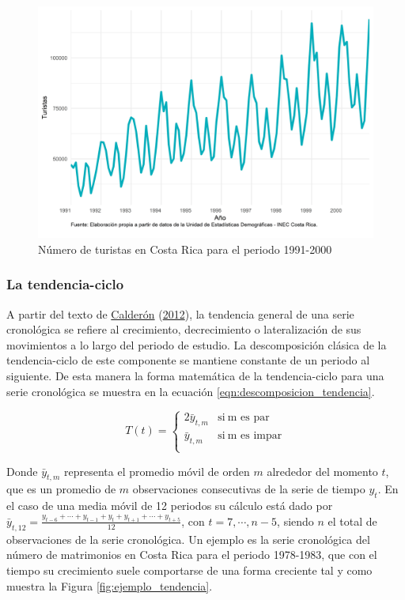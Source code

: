 \documentclass[
]{article}
\begin{document}
\begin{figure}[H]
\includegraphics[width=1\linewidth,height=1\textheight]{Tesis_files/figure-latex/ejemplo_multiplicativa-1} \caption{Número de turistas en Costa Rica para el periodo 1991-2000}\label{fig:ejemplo_multiplicativa}
\end{figure}

\subsubsection{La tendencia-ciclo}

A partir del texto de
\protect\hyperlink{ref-calderon2012estadistica}{Calderón}
(\protect\hyperlink{ref-calderon2012estadistica}{2012}), la tendencia
general de una serie cronológica se refiere al crecimiento,
decrecimiento o lateralización de sus movimientos a lo largo del periodo
de estudio. La descomposición clásica de la tendencia-ciclo de este
componente se mantiene constante de un periodo al siguiente. De esta
manera la forma matemática de la tendencia-ciclo para una serie
cronológica se muestra en la ecuación
\eqref{eqn:descomposicion_tendencia}.

\begin{equation}
\label{eqn:descomposicion_tendencia}
T(t)=
\begin{cases}
2\bar y_{t,m} & \text{si}\ \text{m es par} \\
\bar y_{t, m} & \text{si}\ \text{m es impar} \\
\end{cases}
\end{equation}

Donde \(\bar y_{t,m}\) representa el promedio móvil de orden \(m\)
alrededor del momento \(t\), que es un promedio de \(m\) observaciones
consecutivas de la serie de tiempo \(y_t\). En el caso de una media
móvil de 12 periodos su cálculo está dado por
\(\bar{y}_{t, 12}=\frac{y_{t-6}+\cdots+y_{t-1}+y_t+y_{t+1}+\cdots+y_{t+5}}{12}\),
con \(t=7,\cdots,n-5\), siendo \(n\) el total de observaciones de la
serie cronológica. Un ejemplo es la serie cronológica del número de
matrimonios en Costa Rica para el periodo 1978-1983, que con el tiempo
su crecimiento suele comportarse de una forma creciente tal y como
muestra la Figura \ref{fig:ejemplo_tendencia}.
\end{document}
